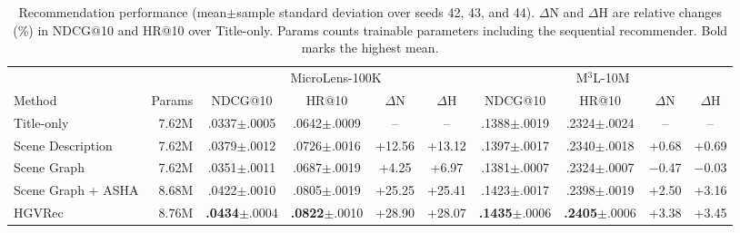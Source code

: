 \begin{table}[t]
  \caption{Recommendation performance (mean$\pm$sample standard deviation over seeds 42, 43, and 44). $\Delta$N and $\Delta$H are relative changes (\%) in NDCG@10 and HR@10 over Title-only. Params counts trainable parameters including the sequential recommender. Bold marks the highest mean.}
  \label{tab:overall-results}
  \centering
  \small
  \setlength{\tabcolsep}{4pt}
  \begin{tabular}{@{}lrcccccccc@{}}
    \toprule
    & & \multicolumn{4}{c}{MicroLens-100K} & \multicolumn{4}{c}{M$^3$L-10M} \\
    \cmidrule(lr){3-6}\cmidrule(l){7-10}
    Method & Params & NDCG@10 & HR@10 & $\Delta$N & $\Delta$H & NDCG@10 & HR@10 & $\Delta$N & $\Delta$H \\
    \midrule
Title-only & 7.62M & .0337$\pm$.0005 & .0642$\pm$.0009 & -- & -- & .1388$\pm$.0019 & .2324$\pm$.0024 & -- & -- \\
Scene Description & 7.62M & .0379$\pm$.0012 & .0726$\pm$.0016 & +12.56 & +13.12 & .1397$\pm$.0017 & .2340$\pm$.0018 & +0.68 & +0.69 \\
Scene Graph & 7.62M & .0351$\pm$.0011 & .0687$\pm$.0019 & +4.25 & +6.97 & .1381$\pm$.0007 & .2324$\pm$.0007 & $-$0.47 & $-$0.03 \\
Scene Graph + ASHA & 8.68M & .0422$\pm$.0010 & .0805$\pm$.0019 & +25.25 & +25.41 & .1423$\pm$.0017 & .2398$\pm$.0019 & +2.50 & +3.16 \\
HGVRec & 8.76M & \textbf{.0434}$\pm$.0004 & \textbf{.0822}$\pm$.0010 & +28.90 & +28.07 & \textbf{.1435}$\pm$.0006 & \textbf{.2405}$\pm$.0006 & +3.38 & +3.45 \\
    \bottomrule
  \end{tabular}
\end{table}
